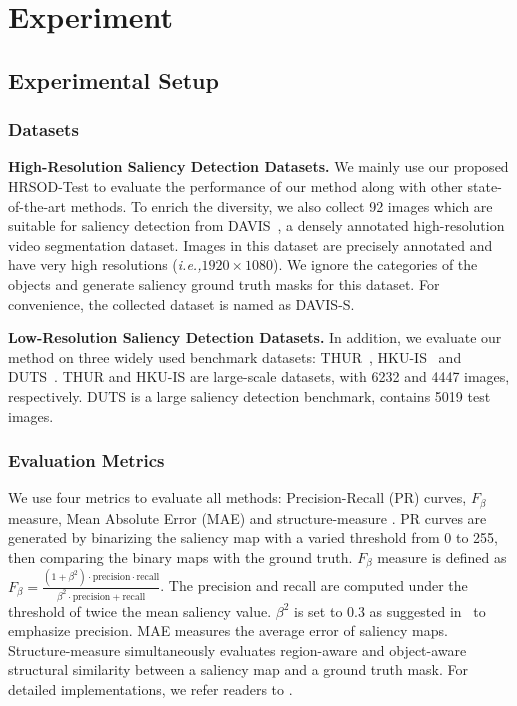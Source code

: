 \section{Experiment}
\subsection{Experimental Setup}
\subsubsection{Datasets}\label{411}
\textbf{High-Resolution Saliency Detection Datasets.} We mainly use our proposed HRSOD-Test to evaluate the performance of our method along with other state-of-the-art methods. To enrich the diversity, we also collect 92 images which are suitable for saliency detection from DAVIS~\cite{perazzi2016benchmark}, a densely annotated high-resolution video segmentation dataset. Images in this dataset are precisely annotated and have very high resolutions (\emph{i.e.,}$1920\times1080$). We ignore the categories of the objects and generate saliency ground truth masks for this dataset. For convenience, the collected dataset is named as DAVIS-S.

\textbf{Low-Resolution Saliency Detection Datasets.} In addition, we evaluate our method on three widely used benchmark datasets: THUR~\cite{cheng2014salientshape}, HKU-IS~\cite{li2015visual} and DUTS~\cite{wang2017}. THUR and HKU-IS are large-scale datasets, with 6232 and 4447 images, respectively. DUTS is a large saliency detection benchmark, contains 5019 test images.
\subsubsection{Evaluation Metrics} We use four metrics to evaluate all methods: Precision-Recall (PR) curves, $F_\beta$ measure, Mean Absolute Error (MAE) and structure-measure \cite{fan2017structure}. PR curves are generated by binarizing the saliency map with a varied threshold from 0 to 255, then comparing the binary maps with the ground truth. $F_\beta$ measure is defined as ${F_\beta } = \frac{{\left( {1 + {\beta ^2}} \right) \cdot \text{precision} \cdot \text{recall}}}{{{\beta ^2} \cdot \text{precision} + \text{recall}}}$. The precision and recall are computed under the threshold of twice the mean saliency value. $\beta^2$ is set to 0.3 as suggested in~\cite{achanta2009frequency} to emphasize precision. MAE measures the average error of saliency maps. Structure-measure simultaneously evaluates region-aware and object-aware structural similarity between a saliency map and a ground truth mask. For detailed implementations, we refer readers to \cite{fan2017structure}.

